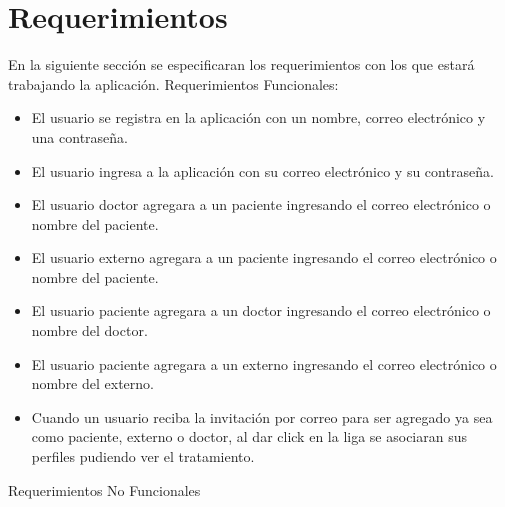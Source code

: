 \begin{itemize}
\end{itemize}


\section{Requerimientos}
En la siguiente sección se especificaran los requerimientos con los que estará trabajando la aplicación.
Requerimientos Funcionales:
\begin{itemize}
	\item El usuario se registra en la aplicación con un nombre, correo electrónico y una contraseña.
	\item El usuario ingresa a la aplicación con su correo electrónico y su contraseña.
	\item El usuario doctor agregara a un paciente ingresando el correo electrónico o nombre del paciente.
	\item El usuario externo agregara a un paciente ingresando el correo electrónico o nombre del paciente.
	\item El usuario paciente agregara a un doctor ingresando el correo electrónico o nombre del doctor.
	\item El usuario paciente agregara a un externo ingresando el correo electrónico o nombre del externo.
	\item Cuando un usuario reciba la invitación por correo para ser agregado ya sea como paciente, externo o doctor, al dar click en la liga se asociaran sus perfiles pudiendo ver el tratamiento.
\end{itemize}
Requerimientos No Funcionales


